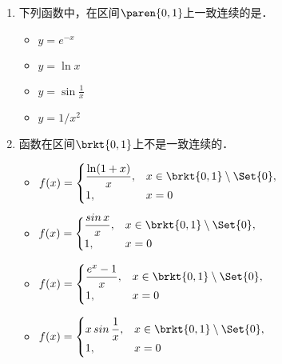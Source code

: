 \documentclass[a4paper,punct=CCT]{ctexbook}
\theoremstyle{definition}
\theoremstyle{remark}
\newif\ifshowsol
\begin{document}
\begin{enumerate}
\item 下列函数中，在区间\(\paren{0,1}\)上一致连续的是\uline{\makebox[6em]{}}．
  \begin{itemize}
    \renewcommand{\labelitemi}{\faCircleThin}
    \ifshowsol
  \item[\faCircle]
    \else
  \item
    \fi
    \(y = e^{-x}\)
  \item \(y = \ln x\)
  \item \(y = \sin\frac1x\)     %
  \item \(y = 1/x^2\)
  \end{itemize}

  \ifshowsol
  由定理~\ref{thm:unicontbothlim}可知，选项~A中的函数在此区间上是一致连续的．由定理~\ref{thm:unicontbndintvbnd}可知，选项~B和~D中的函数并不一致收敛．选项~C见例~\ref{eg:uniconttoposine}．
  \fi

\item 函数\uline{\hspace{10em}}在区间\(\brkt{0,1}\)上不是一致连续的．
  \begin{itemize}
    \renewcommand{\labelitemi}{\faCircleThin}
  \item
    \begin{math}
      f(x) =
      \begin{cases}
        \dfrac{\ln(1+x)}{x}, & x \in \brkt{0,1} \setminus \Set{0}, \\
        1, & x = 0
      \end{cases}
    \end{math}
  \item
    \begin{math}
      f(x) =
      \begin{cases}
        \dfrac{\sin x}{x}, & x \in \brkt{0,1} \setminus \Set{0}, \\
        1, & x = 0
      \end{cases}
    \end{math}
  \item
    \begin{math}
      f(x) =
      \begin{cases}
        \dfrac{e^x-1}{x}, & x \in \brkt{0,1} \setminus \Set{0}, \\
        1, & x = 0
      \end{cases}
    \end{math}
    \ifshowsol
  \item[\faCircle]
    \else
  \item
    \fi
    \begin{math}
      f(x) =
      \begin{cases}
        x \sin\dfrac1x, & x \in \brkt{0,1} \setminus \Set{0}, \\
        1, & x = 0
      \end{cases}
    \end{math}
  \end{itemize}


\end{enumerate}
\end{document}
